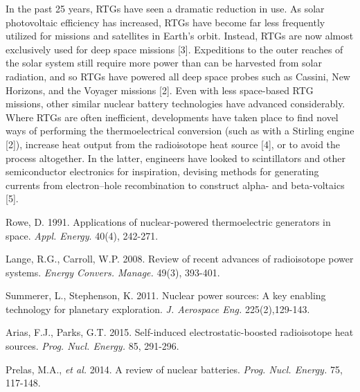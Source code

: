 \documentclass{article}
\newcommand{\tab}{\-\hspace{1cm}}
\begin{document}
\begin{multicols}{2}
\tab In the past 25 years, RTGs have seen a dramatic reduction in use. As solar photovoltaic efficiency has increased, RTGs have become far less frequently utilized for missions and satellites in Earth's orbit. Instead, RTGs are now almost exclusively used for deep space missions [3].  Expeditions to the outer reaches of the solar system still require more power than can be harvested from solar radiation, and so RTGs have powered all deep space probes such as Cassini, New Horizons, and the Voyager missions [2]. Even with less space-based RTG missions, other similar nuclear battery technologies have advanced considerably. Where RTGs are often inefficient, developments have taken place to find novel ways of performing the thermoelectrical conversion (such as with a Stirling engine [2]), increase heat output from the radioisotope heat source [4], or to avoid the process altogether. In the latter, engineers have looked to scintillators and other semiconductor electronics for inspiration, devising methods for generating currents from electron--hole recombination to construct alpha- and beta-voltaics [5].



\begin{thebibliography}{99}
	Rowe, D.
	1991.
	Applications of nuclear-powered thermoelectric generators in space.
	\textit{Appl. Energy}.
	40(4), 242-271.
	
	Lange, R.G., Carroll, W.P. 
	2008.
	Review of recent advances of radioisotope power systems.
	\textit{Energy Convers. Manage.}
	49(3), 393-401.
	
	Summerer, L., Stephenson, K. 
	2011.
	Nuclear power sources: A key enabling technology for planetary exploration.
	\textit{J. Aerospace Eng.}
	225(2),129-143.
	
	Arias, F.J., Parks, G.T.
	2015. 
	Self-induced electrostatic-boosted radioisotope heat sources.
	\textit{Prog. Nucl. Energy.}
	85, 291-296.
	
	Prelas, M.A., \textit{et al.}
	2014. 
	A review of nuclear batteries. 
	\textit{Prog. Nucl. Energy.}
	 75, 117-148.
	
\end{thebibliography}

\end{multicols}
\end{document}
